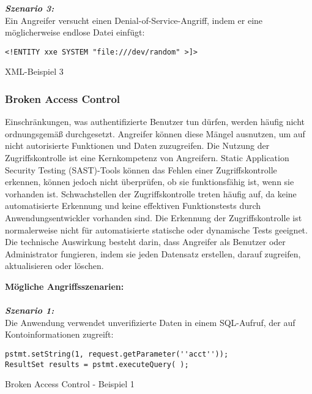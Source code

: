 \textbf{\textit{Szenario 3:}}\\
Ein Angreifer versucht einen Denial-of-Service-Angriff, indem er eine möglicherweise endlose Datei einfügt\cite[10]{owasp17top10}:

\begin{Listing}[h]
	\begin{lstlisting}
<!ENTITY xxe SYSTEM "file:///dev/random" >]>
	\end{lstlisting}
	\caption{XML-Beispiel 3}
	\label{lst:xxe3}
\end{Listing}

\subsubsection{Broken Access Control}

Einschränkungen, was authentifizierte Benutzer tun dürfen, werden häufig nicht ordnungsgemäß durchgesetzt. Angreifer können diese Mängel ausnutzen, um auf nicht autorisierte Funktionen und Daten zuzugreifen\cite[6]{owasp17top10}. Die Nutzung der Zugriffskontrolle ist eine Kernkompetenz von Angreifern. Static Application Security Testing (SAST)-Tools können das Fehlen einer Zugriffskontrolle erkennen, können jedoch nicht überprüfen, ob sie funktionsfähig ist, wenn sie vorhanden ist. Schwachstellen der Zugriffskontrolle treten häufig auf, da keine automatisierte Erkennung und keine effektiven Funktionstests durch Anwendungsentwickler vorhanden sind. Die Erkennung der Zugriffskontrolle ist normalerweise nicht für automatisierte statische oder dynamische Tests geeignet. Die technische Auswirkung besteht darin, dass Angreifer als Benutzer oder Administrator fungieren, indem sie jeden Datensatz erstellen, darauf zugreifen, aktualisieren oder löschen\cite[11]{owasp17top10}.

\textbf{Mögliche Angriffsszenarien:}\\
\\
\textbf{\textit{Szenario 1:}}\\
Die Anwendung verwendet unverifizierte Daten in einem SQL-Aufruf, der auf Kontoinformationen zugreift\cite[11]{owasp17top10}:

\begin{Listing}[h]
	\begin{lstlisting}
pstmt.setString(1, request.getParameter(''acct''));
ResultSet results = pstmt.executeQuery( );
	\end{lstlisting}
	\caption{Broken Access Control - Beispiel 1}
	\label{lst:bac1}
\end{Listing}


